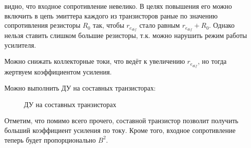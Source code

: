 видно, что входное сопротивление невелико. В целях повышения его можно включить в цепь эмиттера каждого из транзисторов раные по значению сопротивления резисторы $R_0$ так, чтобы $r_{e_{dif}}$ стало равным $r_{e_{dif}} + R_0$. Однако нельзя ставить слишком большие резисторы, т.к. можно нарушить режим работы усилителя.

Можно снижать коллекторные токи, что ведёт к увеличению $r_{e_{dif}}$, но тогда жертвуем коэффициентом усиления.
\pagebreak

Можно выполнить ДУ на составных транзисторах:

\begin{center}
	\begin{figure}[h!]
		\caption{ДУ на составных транзисторах}
	\end{figure}
\end{center} 

Отметим, что помимо всего прочего, составной транзистор позволит получить больший коэффициент усиления по току. Кроме того, входное сопротивление теперь будет пропорционально $B^2$.





